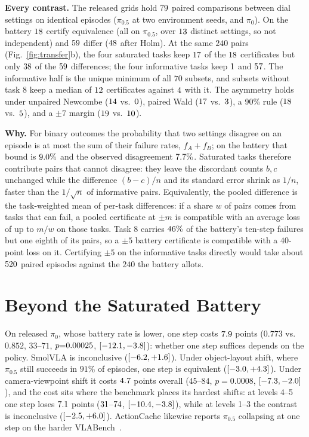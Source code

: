\documentclass[conference]{IEEEtran}
\begin{document}
\textbf{Every contrast.} The released grids hold $79$ paired
comparisons between dial settings on identical episodes ($\pi_{0.5}$ at
two environment seeds, and $\pi_0$). On the battery $18$
certify equivalence (all on $\pi_{0.5}$, over $13$ distinct
settings, so not independent) and $59$ differ ($48$
after Holm). At the same $240$ pairs (Fig.~\ref{fig:transfer}b), the
four saturated tasks keep $17$ of the $18$
certificates but only $38$ of the $59$
differences; the four informative tasks keep $1$ and
$57$. The informative half is the unique minimum of all
$70$ subsets, and subsets without task 8 keep a median of
$12$ certificates against $4$ with it.
The asymmetry holds under unpaired Newcombe ($14$ vs.\
$0$), paired Wald ($17$ vs.\ $3$), a 90\%
rule ($18$ vs.\ $5$), and a $\pm7$ margin
($19$ vs.\ $10$).

\textbf{Why.} For binary outcomes the probability that two settings
disagree on an episode is at most the sum of their failure rates,
$f_A{+}f_B$; on the battery that bound is $9.0\%$ and the
observed disagreement $7.7\%$. Saturated tasks therefore
contribute pairs that cannot disagree: they leave the discordant counts
$b, c$ unchanged while the difference $(b{-}c)/n$ and its standard error
shrink as $1/n$, faster than the $1/\sqrt{n}$ of informative pairs.
Equivalently, the pooled difference is the task-weighted mean of
per-task differences: if a share $w$ of pairs comes from tasks that can
fail, a pooled certificate at $\pm m$ is compatible with an average loss
of up to $m/w$ on those tasks. Task 8 carries $46\%$ of
the battery's ten-step failures but one eighth of its pairs, so a $\pm5$
battery certificate is compatible with a $40$-point loss on it.
Certifying $\pm5$ on the informative tasks directly would take about
$520$ paired episodes against the $240$ the battery allots.

\section{Beyond the Saturated Battery}\label{sec:transfer}
On released $\pi_0$, whose battery rate is lower, one step costs
$7.9$ points ($0.773$ vs.\ $0.852$, $33$--$71$,
$p{=}0.00025$, $[-12.1, -3.8]$): whether one step
suffices depends on the policy. SmolVLA is inconclusive
($[-6.2, +1.6]$). Under object-layout shift, where $\pi_{0.5}$
still succeeds in $91\%$ of episodes, one step is equivalent
($[-3.0, +4.3]$). Under camera-viewpoint shift it costs
$4.7$ points overall ($45$--$84$, $p{=}0.0008$,
$[-7.3, -2.0]$), and the cost sits where the benchmark
places its hardest shifts: at levels 4--5 one step loses
$7.1$ points ($31$--$74$,
$[-10.4, -3.8]$), while at levels 1--3 the contrast is
inconclusive ($[-2.5, +6.0]$). ActionCache likewise
reports $\pi_{0.5}$ collapsing at one step on the harder VLABench~\cite{oi2026actioncache}.
\end{document}
